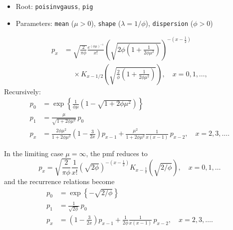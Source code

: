 \documentclass[x11names]{article}
\newcommand{\code}[1]{\texttt{#1}}
\begin{document}
\begin{itemize}
\item Root: \code{poisinvgauss}, \code{pig}
\item Parameters: \code{mean} ($\mu > 0$),
  \code{shape} ($\lambda = 1/\phi$),
  \code{dispersion} ($\phi > 0$)
\end{itemize}
\begin{align*}
  p_x &= \sqrt{\frac{2}{\pi \phi}}
  \frac{e^{(\phi\mu)^{-1}}}{x!}
    \left(
      \sqrt{2\phi \left( 1 + \frac{1}{2\phi\mu^2} \right)}
    \right)^{-(x - \frac{1}{2})} \\
  &\phantom{=} \times
  K_{x - 1/2}
  \left(
    \sqrt{\frac{2}{\phi}\left(1 + \frac{1}{2\phi\mu^2}\right)}
  \right), \quad x = 0, 1, \dots,
\end{align*}
\noindent%
Recursively:
\begin{align*}
  p_0 &= \exp\left\{
        \frac{1}{\phi\mu} \left(1 - \sqrt{1 + 2\phi\mu^2}\right)
        \right\} \\
  p_1 &= \frac{\mu}{\sqrt{1 + 2\phi\mu^2}}\, p_0 \\
  p_x &= \frac{2\phi\mu^2}{1 + 2\phi\mu^2}
        \left( 1 - \frac{3}{2x} \right) p_{x - 1}  + \frac{\mu^2}{1 + 2\phi\mu^2}
        \frac{1}{x(x - 1)}\, p_{x - 2}, \quad x = 2, 3, \dots.
\end{align*}

\noindent%
In the limiting case $\mu = \infty$, the pmf reduces to
\begin{equation*}
  p_x = \sqrt{\frac{2}{\pi \phi}} \frac{1}{x!}
  (\sqrt{2\phi})^{-(x - \frac{1}{2})} K_{x - \frac{1}{2}}
  (\sqrt{2/\phi}),
  \quad x = 0, 1, \dots
\end{equation*}
and the recurrence relations become
\begin{align*}
  p_0 &= \exp\left\{-\sqrt{2/\phi}\right\} \\
  p_1 &= \frac{1}{\sqrt{2\phi}}\, p_0 \\
  p_x &= \left( 1 - \frac{3}{2x} \right) p_{x - 1}
  + \frac{1}{2\phi} \frac{1}{x(x -
    1)}\, p_{x - 2}, \quad x = 2, 3, \dots.
\end{align*}



\end{document}
